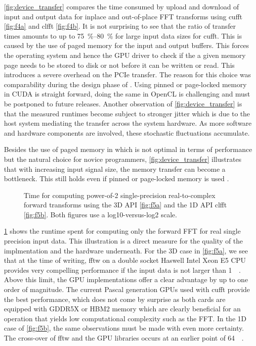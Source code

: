 \cref{fig:device_transfer} compares the time consumed by upload and download of input and output data for inplace and out-of-place FFT transforms using cufft \cref{fig:f4a} and clfft \cref{fig:f4b}. It is not surprising to see that the ratio of transfer times amounts to up to \SIrange{75}{80}{\percent} for large input data sizes for cufft. This is caused by the use of paged memory for the input and output buffers. This forces the operating system and hence the GPU driver to check if the a given memory page needs to be stored to disk or not before it can be written or read. This introduces a severe overhead on the PCIe transfer. The reason for this choice was comparability during the design phase of \gearshifft{}. Using pinned or page-locked memory in CUDA is straight forward, doing the same in OpenCL is challenging and must be postponed to future releases. Another observation of \cref{fig:device_transfer} is that the measured runtimes become subject to stronger jitter  which is due to the host system mediating the transfer across the system hardware. As more software and hardware components are involved, these stochastic fluctuations accumulate. 

Besides the use of paged memory in \gearshifft{} which is not optimal in terms of performance but the natural choice for novice programmers, \cref{fig:device_transfer} illustrates that with increasing input signal size, the memory transfer can become a bottleneck. This still holds even if pinned or page-locked memory is used \cite{steinbach_gtc2015}.

\begin{figure}[!tbp]
  \centering
  \def\svgwidth{0.95\columnwidth}
  
  \def\svgwidth{0.5\columnwidth}
  \subfloat[3D transforms]{\label{fig:f5a}}
  \hfill
  \def\svgwidth{0.5\columnwidth}
  \subfloat[1D transforms]{\label{fig:f5b}}
  \caption{Time for computing power-of-2 single-precision real-to-complex forward transforms using the 3D API \cref{fig:f5a} and the 1D API clfft \cref{fig:f5b}. Both figures use a log10-versus-log2 scale.}
  \label{fig:r2c_fwd}
\end{figure}

\cref{fig:r2c_fwd} shows the runtime spent for computing only the forward FFT for real single precision input data. This illustration is a direct measure for the quality of the implmentation and the hardware underneath. For the 3D case in \cref{fig:f5a}, we see that at the time of writing, fftw on a double socket Haswell Intel Xeon E5 CPU provides very compelling performance if the input data is not larger than \SI{1}{\mebi\byte}. Above this limit, the GPU implementations offer a clear advantage by up to one order of magnitude. The current Pascal generation GPUs used with cufft provide the best performance, which does not come by surprise as both cards are equipped with GDDR5X or HBM2 memory which are clearly beneficial for an operation that yields low computational complexity such as the FFT. In the 1D case of \cref{fig:f5b}, the same observations must be made with even more certainty. The cross-over of fftw and the GPU libraries occurs at an earlier point of \SI{64}{\kibi\byte}.  

